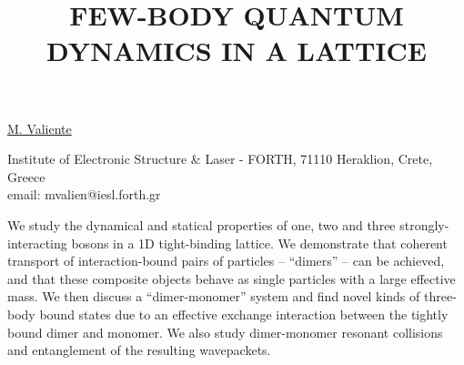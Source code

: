 \title{FEW-BODY QUANTUM DYNAMICS IN A LATTICE}

\underline{M. Valiente}


Institute of Electronic Structure \& Laser - FORTH,
71110 Heraklion, Crete, Greece\\
email: mvalien@iesl.forth.gr

We study the dynamical and statical properties of one, two and
three strongly-interacting bosons in a 1D tight-binding lattice.
We demonstrate that coherent transport of interaction-bound pairs
of particles -- ``dimers'' -- can be achieved, and that these composite
objects behave as single particles with a large effective mass.
We then discuss a ``dimer-monomer'' system and find novel kinds of
three-body bound states due to an effective exchange interaction
between the tightly bound dimer and monomer. We also study
dimer-monomer resonant collisions and entanglement of the
resulting wavepackets.

\vspace{\baselineskip}